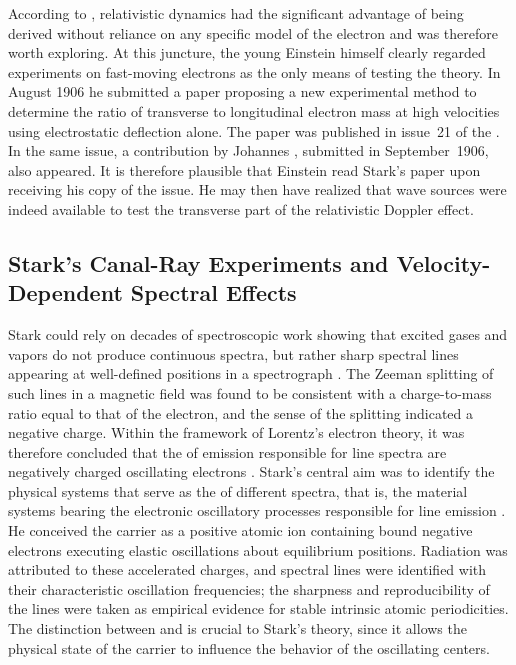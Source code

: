\documentclass[pdflatex]{sn-jnl}
\begin{document}
According to \citet{Planck1906}, relativistic dynamics had the significant advantage of being derived without reliance on any specific model of the electron and was therefore worth exploring. At this juncture, the young Einstein himself clearly regarded experiments on fast-moving electrons as the only means of testing the theory. In August 1906 he submitted a paper \citep{Einstein1906c} proposing a new experimental method to determine the ratio of transverse to longitudinal electron mass at high velocities using electrostatic deflection alone. The paper was published in issue~21 of the . In the same issue, a contribution by Johannes \citet{Stark1906}, submitted in September~1906, also appeared. It is therefore plausible that Einstein read Stark’s paper upon receiving his copy of the  issue. He may then have realized that wave sources were indeed available to test the transverse part of the relativistic Doppler effect.


\subsection{Stark’s Canal-Ray Experiments and Velocity-Dependent Spectral Effects\label{sub:stark}}
%
Stark could rely on decades of spectroscopic work showing that excited gases and vapors do not produce continuous spectra, but rather sharp spectral lines appearing at well-defined positions in a spectrograph \citep{Hentschel2002}. The Zeeman splitting of such lines in a magnetic field was found to be consistent with a charge-to-mass ratio equal to that of the electron, and the sense of the splitting indicated a negative charge. Within the framework of Lorentz’s electron theory, it was therefore concluded that the   of emission responsible for line spectra are negatively charged oscillating electrons \citep[401]{Stark1906}. Stark’s central aim was to identify the physical systems that serve as the   of different spectra, that is, the material systems bearing the electronic oscillatory processes responsible for line emission \citep[402]{Stark1906}. He conceived the carrier as a positive atomic ion containing bound negative electrons executing elastic oscillations about equilibrium positions. Radiation was attributed to these accelerated charges, and spectral lines were identified with their characteristic oscillation frequencies; the sharpness and reproducibility of the lines were taken as empirical evidence for stable intrinsic atomic periodicities. The distinction between  and  is crucial to Stark’s theory, since it allows the physical state of the carrier to influence the behavior of the oscillating centers.
\end{document}
